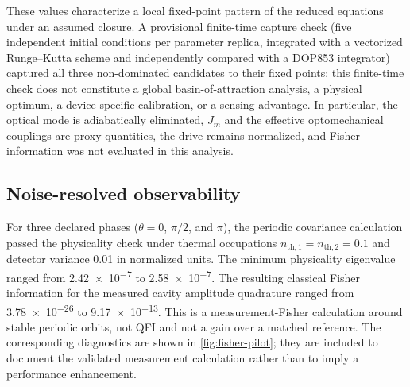 \documentclass[aip,cha,reprint]{revtex4-2}
\begin{document}
These values characterize a local fixed-point pattern of the reduced equations under
an assumed closure. A provisional finite-time capture check (five independent
initial conditions per parameter replica, integrated with a vectorized Runge--Kutta
scheme and independently compared with a DOP853 integrator) captured all three
non-dominated candidates to their fixed points; this finite-time check does not
constitute a global basin-of-attraction analysis, a physical optimum, a
device-specific calibration, or a sensing advantage. In
particular, the optical mode is adiabatically eliminated, $J_m$ and the effective
optomechanical couplings are proxy quantities, the drive remains normalized, and
Fisher information was not evaluated in this analysis.

\subsection{Noise-resolved observability}

For three declared phases ($\theta=0$, $\pi/2$, and $\pi$), the periodic
covariance calculation passed the physicality check under thermal occupations
$n_{\mathrm{th},1}=n_{\mathrm{th},2}=\num{0.1}$ and detector variance \num{0.01} in
normalized units. The minimum physicality eigenvalue ranged from
\num{2.42e-7} to \num{2.58e-7}. The resulting classical Fisher information for the
measured cavity amplitude quadrature ranged from \num{3.78e-26} to
\num{9.17e-13}. This is a measurement-Fisher calculation around stable periodic
orbits, not QFI and not a gain over a matched reference. The corresponding
diagnostics are shown in \cref{fig:fisher-pilot}; they are included to document
the validated measurement calculation rather than to imply a performance
enhancement.
\end{document}
